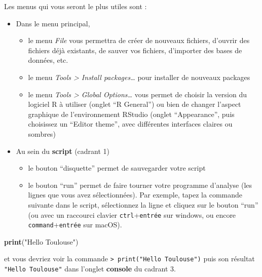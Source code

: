 \documentclass[
]{book}
\newenvironment{Shaded}{\begin{snugshade}}{\end{snugshade}}
\newcommand{\FunctionTok}[1]{\textcolor[rgb]{0.13,0.29,0.53}{\textbf{#1}}}
\newcommand{\NormalTok}[1]{#1}
\newcommand{\StringTok}[1]{\textcolor[rgb]{0.31,0.60,0.02}{#1}}
\providecommand{\tightlist}{%
  \setlength{\itemsep}{0pt}\setlength{\parskip}{0pt}}
\begin{document}
Les menus qui vous seront le plus utiles sont :

\begin{itemize}
\tightlist
\item
  Dans le menu principal,

  \begin{itemize}
  \tightlist
  \item
    le menu \emph{File} vous permettra de créer de nouveaux fichiers, d'ouvrir des fichiers déjà existants, de sauver vos fichiers, d'importer des bases de données, etc.
  \item
    le menu \emph{Tools \textgreater{} Install packages\ldots{}} pour installer de nouveaux packages
  \item
    le menu \emph{Tools \textgreater{} Global Options\ldots{}} vous permet de choisir la version du logiciel R à utiliser (onglet ``R General'') ou bien de changer l'aspect graphique de l'environnement RStudio (onglet ``Appearance'', puis choisissez un ``Editor theme'', avec différentes interfaces claires ou sombres)
  \end{itemize}
\item
  Au sein du \textbf{script} (cadrant 1)

  \begin{itemize}
  \tightlist
  \item
    le bouton ``disquette'' permet de sauvegarder votre script
  \item
    le bouton ``run'' permet de faire tourner votre programme d'analyse (les lignes que vous avez sélectionnées). Par exemple, tapez la commande suivante dans le script, sélectionnez la ligne et cliquez sur le bouton ``run'' (ou avec un raccourci clavier \texttt{ctrl}+\texttt{entrée} sur windows, ou encore \texttt{command}+\texttt{entrée} sur macOS).
  \end{itemize}
\end{itemize}

\begin{Shaded}
\begin{Highlighting}[]
\FunctionTok{print}\NormalTok{(}\StringTok{"Hello Toulouse"}\NormalTok{)}
\end{Highlighting}
\end{Shaded}

et vous devriez voir la commande \texttt{\textgreater{}\ print("Hello\ Toulouse")} puis son résultat \texttt{"Hello\ Toulouse"} dans l'onglet \textbf{console} du cadrant 3.
\end{document}
